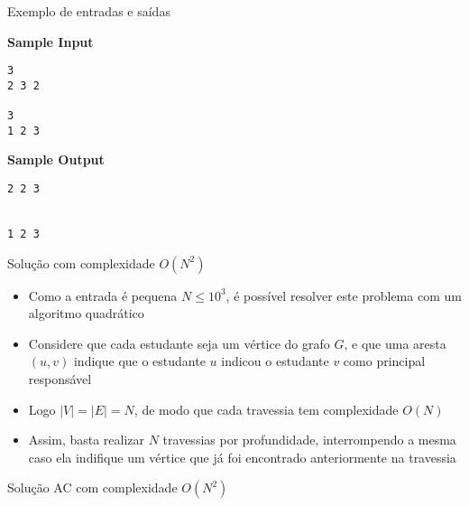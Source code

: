 \begin{frame}[fragile]{Exemplo de entradas e saídas}

\begin{minipage}[t]{0.5\textwidth}
\textbf{Sample Input}
\begin{verbatim}
3
2 3 2

3
1 2 3
\end{verbatim}
\end{minipage}
\begin{minipage}[t]{0.45\textwidth}
\textbf{Sample Output}
\begin{verbatim}
2 2 3 


1 2 3 
\end{verbatim}
\end{minipage}
\end{frame}

\begin{frame}[fragile]{Solução com complexidade $O(N^2)$}

    \begin{itemize}
        \item Como a entrada é pequena $N\leq 10^3$, é possível resolver este problema
            com um algoritmo quadrático

        \item Considere que cada estudante seja um vértice do grafo $G$, e que uma aresta
            $(u, v)$ indique que o estudante $u$ indicou o estudante $v$ como principal
            responsável

        \item Logo $|V| = |E| = N$, de modo que cada travessia tem complexidade $O(N)$

        \item Assim, basta realizar $N$ travessias por profundidade, interrompendo a 
            mesma caso ela indifique um vértice que já foi encontrado anteriormente na travessia
   \end{itemize}

\end{frame}

\begin{frame}[fragile]{Solução AC com complexidade $O(N^2)$}
\end{frame}
